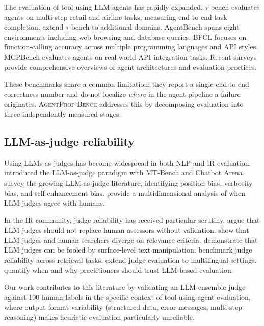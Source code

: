 \documentclass{ieeeaccess}
\newcommand{\bench}{\textsc{AgentProp-Bench}\xspace}
\begin{document}
The evaluation of tool-using LLM agents has rapidly expanded.
$\tau$-bench \cite{yao2024tau} evaluates agents on multi-step retail
and airline tasks, measuring end-to-end task completion.
\cite{barres2025tau2} extend $\tau$-bench to additional domains.
AgentBench \cite{liu2024agentbench} spans eight environments including
web browsing and database queries.
BFCL \cite{yan2025bfcl} focuses on function-calling accuracy across
multiple programming languages and API styles.
MCPBench \cite{mcpagentbench2026} evaluates agents on real-world API
integration tasks.
Recent surveys \cite{yehudai2025surveyeval,xie2025agentir} provide
comprehensive overviews of agent architectures and evaluation practices.

These benchmarks share a common limitation: they report a single
end-to-end correctness number and do not localize \emph{where} in the
agent pipeline a failure originates.
\bench{} addresses this by decomposing evaluation into three
independently measured stages.

\subsection{LLM-as-judge reliability}

Using LLMs as judges has become widespread in both NLP and IR evaluation.
\cite{zheng2023judging} introduced the LLM-as-judge paradigm with
MT-Bench and Chatbot Arena.
\cite{gu2024surveyjudge} survey the growing LLM-as-judge literature,
identifying position bias, verbosity bias, and self-enhancement bias.
\cite{bavaresco2024llmsjudges} provide a multidimensional analysis of
when LLM judges agree with humans.

In the IR community, judge reliability has received particular scrutiny.
\cite{soboroff2024dont} argue that LLM judges should not replace human
assessors without validation.
\cite{thomas2024searcher} show that LLM judges and human searchers
diverge on relevance criteria.
\cite{alaofi2024fooled} demonstrate that LLM judges can be fooled by
surface-level text manipulation.
\cite{thakur2025judging} benchmark judge reliability across retrieval
tasks.
\cite{fu2025multilingual} extend judge evaluation to multilingual
settings.
\cite{schroeder2024trust} quantify when and why practitioners should
trust LLM-based evaluation.

Our work contributes to this literature by validating an LLM-ensemble
judge against 100 human labels in the specific context of tool-using
agent evaluation, where output format variability (structured data,
error messages, multi-step reasoning) makes heuristic evaluation
particularly unreliable.
\end{document}
